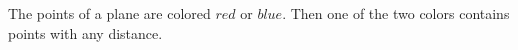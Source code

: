 The points of a plane are colored $red$ or $blue$. Then one of the two colors contains points with any distance.
